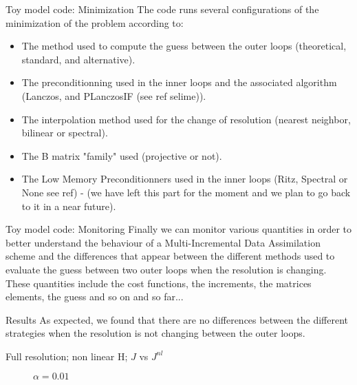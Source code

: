 \documentclass[10pt]{beamer}
\begin{document}
\begin{frame}{Toy model code: Minimization}
The code runs several configurations of the minimization of the problem according to:\\
\vspace{+0.5cm}
\begin{itemize}
 \item The method used to compute the guess between the outer loops (theoretical, standard, and alternative).
 \item The preconditionning used in the inner loops and the associated algorithm (Lanczos, and PLanczosIF (see ref selime)).
 \item The interpolation method used for the change of resolution (nearest neighbor, bilinear or spectral).
 \item The B matrix "family" used (projective or not).
 \item The Low Memory Preconditionners used in the inner loops (Ritz, Spectral or None see ref) - (we have left this part for the moment and we plan to go back to it in a near future).
\end{itemize}
\end{frame}

\begin{frame}{Toy model code: Monitoring}
 Finally we can monitor various quantities in order to better understand the behaviour of a Multi-Incremental Data Assimilation scheme and the differences that appear between the different methods used to evaluate the guess between two outer loops when the resolution is changing.\\
 These quantities include the cost functions, the increments, the matrices elements, the guess and so on and so far...
\end{frame}




\begin{frame}{Results}
As expected, we found that there are no differences between the different strategies when the resolution is not changing between the outer loops. 
\end{frame}




\begin{frame}{Full resolution; non linear H; $J$ vs $J^{nl}$}
\begin{center}
\begin{figure}
  \caption{$\alpha = 0.01$}
\endminipage\hfill
{}
  \caption{$\alpha = 0.01$}
\endminipage
\end{figure}
\end{center}
\end{frame}


\usebackgroundtemplate{}
\end{document}

